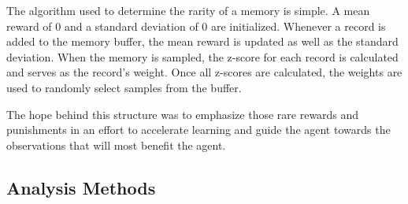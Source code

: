 The algorithm used to determine the rarity of a memory is simple.
A mean reward of 0 and a standard deviation of 0 are initialized.
Whenever a record is added to the memory buffer, the mean reward is updated as well as
the standard deviation.
When the memory is sampled, the z-score for each record is calculated and serves as
the record's weight.
Once all z-scores are calculated, the weights are used to randomly select samples
from the buffer.

The hope behind this structure was to emphasize those rare rewards and punishments in
an effort to accelerate learning and guide the agent towards the observations that
will most benefit the agent.

\subsection{Analysis Methods}\label{subsec:analysis-methods}
